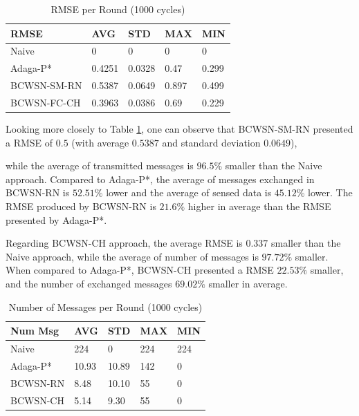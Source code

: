 \documentclass[conference]{IEEEtran}
\begin{document}
\begin{table}[h!]
\caption{RMSE per Round (1000 cycles)}
\label{tab:rmse}
\begin{center}
\begin{tabular}{|l||l|l|l|l|}
\hline
RMSE &AVG &STD &MAX &MIN \\
\hline\hline
Naive &0 &0 &0 &0 \\
\hline
Adaga-P* &0.4251 &0.0328 &0.47 &0.299 \\
\hline
BCWSN-SM-RN &0.5387 &0.0649 &0.897 &0.499 \\
\hline
BCWSN-FC-CH &0.3963 &0.0386 &0.69 &0.229 \\
\hline
\end{tabular}
\end{center}
\end{table}


Looking more closely to Table \ref{tab:rmse}, one can observe that BCWSN-SM-RN
presented a RMSE of $0.5$ (with average $0.5387$ and standard deviation $0.0649$),




while the average of transmitted messages is $96.5\%$ smaller than the Naive
approach. Compared to Adaga-P*, the average of messages exchanged in BCWSN-RN is
 $52.51\%$ lower and the average of sensed data is $45.12\%$ lower. The RMSE
produced by BCWSN-RN is $21.6\%$ higher in average than the RMSE presented by
Adaga-P*.


Regarding BCWSN-CH approach, the average RMSE is $0.337$ smaller than the Naive
approach, while the average of number of messages is $97.72\%$ smaller. When
compared to Adaga-P*, BCWSN-CH presented a RMSE $22.53\%$ smaller, and the
number of exchanged messages $69.02\%$ smaller in average.



\begin{table}[h!]
\caption{Number of Messages per Round (1000 cycles)}
\label{tab:num-msg}
\begin{center}
\begin{tabular}{|l||l|l|l|l|}
\hline
Num Msg &AVG &STD &MAX &MIN \\
\hline\hline
Naive &224 &0 &224 &224 \\
\hline
Adaga-P* &10.93 &10.89 &142 &0 \\
\hline
BCWSN-RN &8.48 &10.10 &55 &0 \\
\hline
BCWSN-CH &5.14 &9.30 &55 &0 \\
\hline
\end{tabular}
\end{center}
\end{table}
\end{document}
